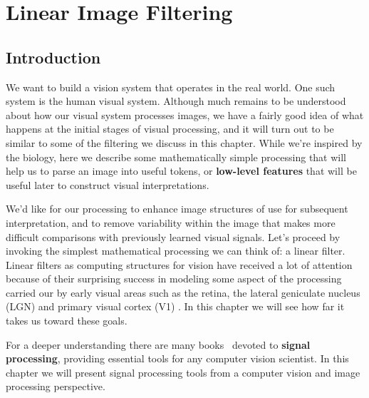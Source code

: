 \chapter{Linear Image Filtering}
\label{chapter:linear_image_filtering}

\section{Introduction}

We want to build a vision system that operates in the real
world.  One such system is the human visual system.  Although much remains to be understood about how 
our visual system processes images, we have a fairly good idea of what happens at the initial stages of
visual processing, and it will turn out to be similar to some of the
filtering we discuss in this chapter.  While we're inspired by the
biology, here we describe some mathematically simple processing  that will
help us to parse an image into useful tokens, or {\bf low-level features} that
will be useful later to construct visual interpretations.

We'd like for our processing to enhance image structures of
use for subsequent interpretation, and to remove variability within
the image that makes more difficult comparisons with previously
learned visual signals.  Let's proceed by invoking the simplest mathematical
processing we can think of: a linear filter. Linear filters as computing structures for vision have received a lot of attention because of their surprising success in modeling some aspect of the processing carried our by early visual areas such as the retina, the lateral geniculate nucleus (LGN) and primary visual cortex (V1) \cite{Hubel62}. In this chapter we will see how far it takes us toward these goals.


For a deeper understanding there are many books~\cite{Oppenheim1996} devoted to {\bf signal processing},
providing essential tools for any computer vision scientist. In this chapter we will present signal processing tools from a computer vision and image processing perspective. 




